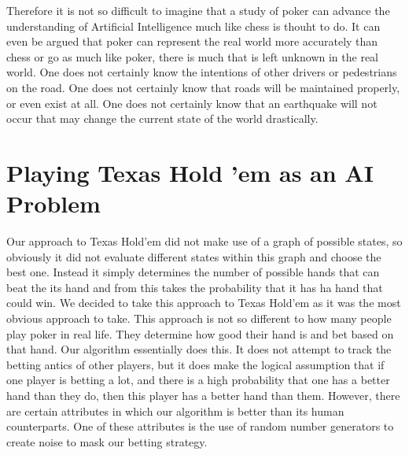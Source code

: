 \documentclass[10pt, a4paper, twocolumn]{article} %
\begin{document}
Therefore it is not so difficult to imagine that a study of poker can advance the understanding of Artificial Intelligence much like chess is thouht to do. It can even be argued that poker can represent the real world more accurately than chess or go as much like poker, there is much that is left unknown in the real world. One does not certainly know the intentions of other drivers or pedestrians on the road. One does not certainly know that roads will be maintained properly, or even exist at all. One does not certainly know that an earthquake will not occur that may change the current state of the world drastically.


\section{Playing Texas Hold 'em as an AI Problem}

Our approach to Texas Hold'em did not make use of a graph of possible states, so obviously it did not evaluate different states within this graph and choose the best one. Instead it simply determines the number of possible hands that can beat the its hand and from this takes the probability that it has ha hand that could win. We decided to take this approach to Texas Hold'em as it was the most obvious approach to take. This approach is not so different to how many people play poker in real life. They determine how good their hand is and bet based on that hand. Our algorithm essentially does this. It does not attempt to track the betting antics of other players, but it does make the logical assumption that if one player is betting a lot, and there is a high probability that one has a better hand than they do, then this player has a better hand than them. However, there are certain attributes in which our algorithm is better than its human counterparts. One of these attributes is the use of random number generators to create noise to mask our betting strategy.
\end{document}
